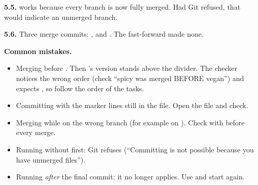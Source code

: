 \textbf{5.5.}  works because every branch is now fully merged. Had Git refused, that would indicate an unmerged branch.

\textbf{5.6.} Three merge commits: ,  and . The  fast-forward made none.

\textbf{Common mistakes.}
\begin{itemize}
  \item Merging  before . Then 's version stands above the divider. The checker notices the wrong order (check ``spicy was merged BEFORE vegan'') and expects , so follow the order of the tasks.
  \item Committing with the marker lines still in the file. Open the file and check.
  \item Merging while on the wrong branch (for example on ). Check with  before every merge.
  \item Running  without  first: Git refuses (``Committing is not possible because you have unmerged files'').
  \item Running  \emph{after} the final commit: it no longer applies. Use  and start again.
\end{itemize}
